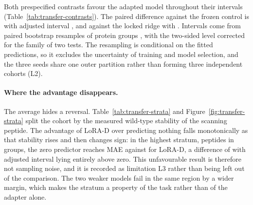 \begin{table}[htbp]
  \centering
  \caption[Held-source transfer results after the final refit]{Held-source transfer results after the final refit. MAE and RMSE are lower-is-better in
  PSI units; Spearman and positive-event AUROC are higher-is-better. Brier is the three-class score.
  Rank statistics are undefined for the two constant predictors.}
  \label{tab:transfer-main}
  
\end{table}

Both prespecified contrasts favour the adapted model throughout their intervals
(Table~\ref{tab:transfer-contrasts}). The paired difference against the frozen control is
\nTDeltaFrozen{} with adjusted interval \nTDeltaFrozenCI{}, and against the locked ridge
\nTDeltaWfive{} with \nTDeltaWfiveCI{}. Intervals come from \nTBootstrap{} paired bootstrap
resamples of protein groups \citep{efron1979}, with the two-sided level corrected for the family of
two tests. The resampling is conditional on the fitted predictions, so it excludes the uncertainty
of training and model selection, and the three seeds share one outer partition rather than forming
three independent cohorts (L2).

\begin{table}[htbp]
  \centering
  \caption[Prespecified transfer contrasts]{Prespecified transfer contrasts. Negative differences favour LoRA-D. The adjusted
  interval corrects the two-sided level for the family of two comparisons; a confidence interval
  that excludes zero is not a statement about effect size in a new assay.}
  \label{tab:transfer-contrasts}
  
\end{table}

\paragraph{Where the advantage disappears.}
The average hides a reversal. Table~\ref{tab:transfer-strata} and Figure~\ref{fig:transfer-strata}
split the cohort by the measured wild-type stability of the scanning peptide. The advantage of
LoRA-D over predicting nothing falls monotonically as that stability rises and then changes sign:
in the highest stratum, \nTGtFiveN{} peptides in \nTGtFiveGroups{} groups, the zero predictor
reaches MAE \nTGtFiveZero{} against \nTGtFiveLora{} for LoRA-D, a difference of \nTGtFiveDelta{}
with adjusted interval \nTGtFiveCI{} lying entirely above zero. This unfavourable result is
therefore not sampling noise, and it is recorded as limitation L3 rather than being left out of the
comparison. The two weaker models fail in the same region by a wider margin, which makes the
stratum a property of the task rather than of the adapter alone.

